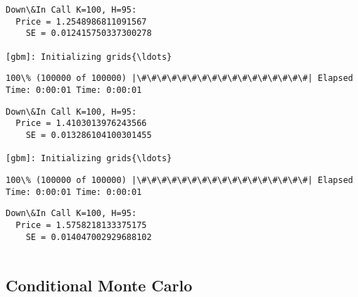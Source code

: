 \documentclass[11pt]{article}
\begin{document}
    \begin{Verbatim}[commandchars=\\\{\}]
Down\&In Call K=100, H=95:
  Price = 1.2548986811091567
    SE = 0.012415750337300278

[gbm]: Initializing grids{\ldots}

    \end{Verbatim}

    \begin{Verbatim}[commandchars=\\\{\}]
100\% (100000 of 100000) |\#\#\#\#\#\#\#\#\#\#\#\#\#\#\#\#\#| Elapsed Time: 0:00:01 Time: 0:00:01

    \end{Verbatim}

    \begin{Verbatim}[commandchars=\\\{\}]
Down\&In Call K=100, H=95:
  Price = 1.4103013976243566
    SE = 0.013286104100301455

[gbm]: Initializing grids{\ldots}

    \end{Verbatim}

    \begin{Verbatim}[commandchars=\\\{\}]
100\% (100000 of 100000) |\#\#\#\#\#\#\#\#\#\#\#\#\#\#\#\#\#| Elapsed Time: 0:00:01 Time: 0:00:01

    \end{Verbatim}

    \begin{Verbatim}[commandchars=\\\{\}]
Down\&In Call K=100, H=95:
  Price = 1.5758218133375175
    SE = 0.014047002929688102


    \end{Verbatim}

    \subsection{Conditional Monte Carlo}\label{conditional-monte-carlo}
\end{document}
